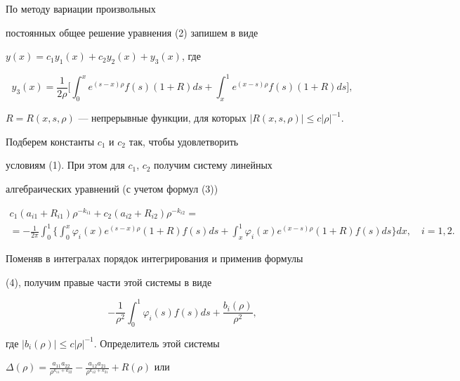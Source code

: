 \begin{pf} По методу вариации произвольных 


постоянных общее решение уравнения (2) запишем в виде 


$y(x)=c_1y_1(x)+c_2y_2(x)+y_3(x)$, где 


$$ 


y_3(x)=\frac{1}{2\rho}\bigg[\int^x_0 e^{(s-x)\rho} 


f(s)(1+R)ds+\int^1_x e^{(x-s)\rho}f(s)(1+R)ds\bigg], 


$$ 


$R=R(x,s,\rho)$ --- непрерывные функции, для которых $|R(x,s,\rho)|\le 


c|\rho|^{-1}$. 


 


Подберем константы $c_1$ и $c_2$ так, чтобы удовлетворить  


условиям (1). При этом для $c_1$, $c_2$ получим систему линейных 


алгебраических уравнений (с учетом формул (3)) 


\begin{multline*} 


c_1(a_{i1}+R_{i1})\rho^{-k_{i1}}+ 


c_2(a_{i2}+R_{i2})\rho^{-k_{i2}}= \\ 


% 


=-\frac{1}{2\pi}\int^1_0\bigg\{\int^x_0\varphi_i(x) 


e^{(s-x)\rho}(1+R)f(s)ds+ 


\int^1_x\varphi_i(x)e^{(x-s)\rho}(1+R)f(s)ds\bigg\}dx, 


\quad i=1,2. 


\end{multline*} 


Поменяв в интегралах порядок интегрирования и применив формулы 


(4), получим правые части этой системы в виде 


$$ 


-\frac{1}{\rho^2}\int^1_0\varphi_i(s)f(s)ds+ 


\frac{b_i(\rho)}{\rho^2}, 


$$ 


где $|b_i(\rho)|\le c|\rho|^{-1}$. Определитель этой системы 


$\Delta(\rho)=\frac{a_{11}a_{22}}{\rho^{k_{11}+k_{22}}}- 


\frac{a_{12}a_{21}}{\rho^{k_{12}+k_{21}}}+R(\rho)$ или 



\end{pf}
